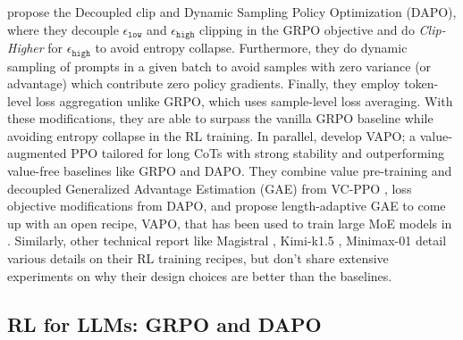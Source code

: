 \documentclass[]{fairmeta} %
\def\eps{{\epsilon}}
\begin{document}
\citet{yu2025dapo} propose the Decoupled clip and Dynamic Sampling Policy Optimization (DAPO), where they decouple $\eps_{\texttt{low}}$ and $\eps_{\texttt{high}}$ clipping in the GRPO objective and do \textit{Clip-Higher} for $\eps_{\texttt{high}}$ to avoid entropy collapse. Furthermore, they do dynamic sampling of prompts in a given batch to avoid samples with zero variance (or advantage) which contribute zero policy gradients. Finally, they employ token-level loss aggregation unlike GRPO, which uses sample-level loss averaging. With these modifications, they are able to surpass the vanilla GRPO baseline while avoiding entropy collapse in the RL training. In parallel, \citet{yue2025vapo} develop VAPO; a value-augmented PPO tailored for long CoTs with strong stability and outperforming value-free baselines like GRPO and DAPO. They combine value pre-training and decoupled Generalized Advantage Estimation (GAE) from VC-PPO \citep{yuan2025s}, loss objective modifications from DAPO, and propose length-adaptive GAE to come up with an open recipe, VAPO, that has been used to train large MoE models in \citet{seed2025seed1}. Similarly, other technical report like Magistral \citep{rastogi2025magistral}, Kimi-k1.5 \citep{team2025kimi}, Minimax-01 \citep{li2025minimax} detail various details on their RL training recipes, but don't share extensive experiments on why their design choices are better than the baselines.

\subsection{RL for LLMs: GRPO and DAPO}\label{appendix:background}
\end{document}
